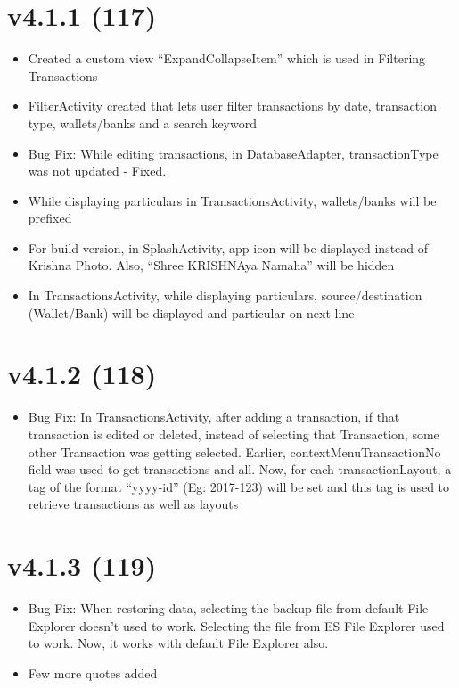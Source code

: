 \documentclass{article}
\begin{document}
    \section{v4.1.1 (117)}\label{sec:117}
    \begin{itemize}
        \item Created a custom view ``ExpandCollapseItem'' which is used in Filtering Transactions
        \item FilterActivity created that lets user filter transactions by date, transaction type, wallets/banks and a search keyword
        \item Bug Fix: While editing transactions, in DatabaseAdapter, transactionType was not updated - Fixed.
        \item While displaying particulars in TransactionsActivity, wallets/banks will be prefixed
        \item For build version, in SplashActivity, app icon will be displayed instead of Krishna Photo.
        Also, ``Shree KRISHNAya Namaha'' will be hidden
        \item In TransactionsActivity, while displaying particulars, source/destination (Wallet/Bank) will be displayed and particular on next line
    \end{itemize}

    \section{v4.1.2 (118)}\label{sec:118}
    \begin{itemize}
        \item Bug Fix: In TransactionsActivity, after adding a transaction, if that transaction is edited or deleted, instead of selecting that Transaction, some other Transaction was getting selected.
        Earlier, contextMenuTransactionNo field was used to get transactions and all.
        Now, for each transactionLayout, a tag of the format ``yyyy-id'' (Eg: 2017-123) will be set and this tag is used to retrieve transactions as well as layouts
    \end{itemize}

    \section{v4.1.3 (119)}\label{sec:119}
    \begin{itemize}
        \item Bug Fix: When restoring data, selecting the backup file from default File Explorer doesn't used to work.
        Selecting the file from ES File Explorer used to work.
        Now, it works with default File Explorer also.
        \item Few more quotes added
    \end{itemize}
\end{document}

